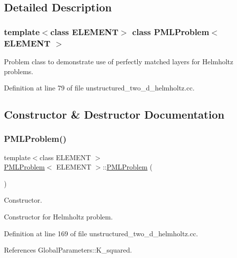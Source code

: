 \subsection{Detailed Description}
\subsubsection*{template$<$class E\+L\+E\+M\+E\+NT$>$\newline
class P\+M\+L\+Problem$<$ E\+L\+E\+M\+E\+N\+T $>$}

Problem class to demonstrate use of perfectly matched layers for Helmholtz problems. 

Definition at line 79 of file unstructured\+\_\+two\+\_\+d\+\_\+helmholtz.\+cc.



\subsection{Constructor \& Destructor Documentation}
\mbox{\label{classPMLProblem_ae6cc833e2485ad6d37d6dd14105bf407}} 
\subsubsection{\texorpdfstring{P\+M\+L\+Problem()}{PMLProblem()}\hspace{0.1cm}{\footnotesize\ttfamily [1/2]}}
{\footnotesize\ttfamily template$<$class E\+L\+E\+M\+E\+NT $>$ \\
\hyperlink{classPMLProblem}{P\+M\+L\+Problem}$<$ E\+L\+E\+M\+E\+NT $>$\+::\hyperlink{classPMLProblem}{P\+M\+L\+Problem} (\begin{DoxyParamCaption}{ }\end{DoxyParamCaption})}



Constructor. 

Constructor for Helmholtz problem. 

Definition at line 169 of file unstructured\+\_\+two\+\_\+d\+\_\+helmholtz.\+cc.



References Global\+Parameters\+::\+K\+\_\+squared.

\mbox{\label{classPMLProblem_a4922fc5b0ef4cf43c41ee9149712adb1}} 
